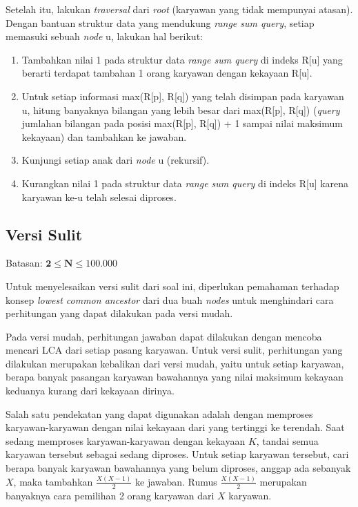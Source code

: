\documentclass[../main_editorial.tex]{subfiles} %
\begin{document}
Setelah itu, lakukan \textit{traversal} dari \textit{root} (karyawan yang tidak mempunyai atasan). Dengan bantuan struktur data yang mendukung \textit{range sum query}, setiap memasuki sebuah \textit{node} u, lakukan hal berikut:
\begin{enumerate}
	\item Tambahkan nilai 1 pada struktur data \textit{range sum query} di indeks R[u] yang berarti terdapat tambahan 1 orang karyawan dengan kekayaan R[u].
	\item Untuk setiap informasi max(R[p], R[q]) yang telah disimpan pada karyawan u, hitung banyaknya bilangan yang lebih besar dari max(R[p], R[q]) (\textit{query} jumlahan bilangan pada posisi max(R[p], R[q]) + 1 sampai nilai maksimum kekayaan) dan tambahkan ke jawaban.
	\item Kunjungi setiap anak dari \textit{node} u (rekursif).
	\item Kurangkan nilai 1 pada struktur data \textit{range sum query} di indeks R[u] karena karyawan ke-u telah selesai diproses.
\end{enumerate}

\subsection*{Versi Sulit}

Batasan: $\mathbf{2 \le N \le 100.000}$

Untuk menyelesaikan versi sulit dari soal ini, diperlukan pemahaman terhadap konsep \textit{lowest common ancestor} dari dua buah \textit{nodes} untuk menghindari cara perhitungan yang dapat dilakukan pada versi mudah.

Pada versi mudah, perhitungan jawaban dapat dilakukan dengan mencoba mencari LCA dari setiap pasang karyawan. Untuk versi sulit, perhitungan yang dilakukan merupakan kebalikan dari versi mudah, yaitu untuk setiap karyawan, berapa banyak pasangan karyawan bawahannya yang nilai maksimum kekayaan keduanya kurang dari kekayaan dirinya.

Salah satu pendekatan yang dapat digunakan adalah dengan memproses karyawan-karyawan dengan nilai kekayaan dari yang tertinggi ke terendah. Saat sedang memproses karyawan-karyawan dengan kekayaan $K$, tandai semua karyawan tersebut sebagai sedang diproses. Untuk setiap karyawan tersebut, cari berapa banyak karyawan bawahannya yang belum diproses, anggap ada sebanyak $X$, maka tambahkan $\frac{X (X - 1)}{2}$ ke jawaban. Rumus $\frac{X (X - 1)}{2}$ merupakan banyaknya cara pemilihan 2 orang karyawan dari $X$ karyawan.
\end{document}
